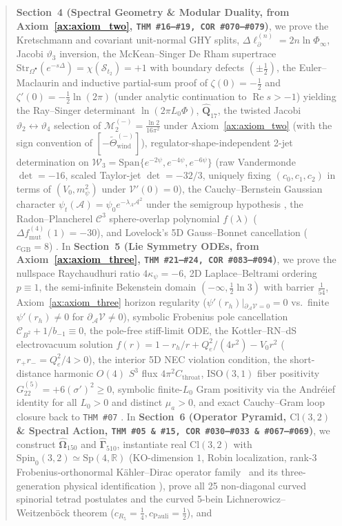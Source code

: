 \documentclass[11pt,a4paper]{article}
\newcommand{\catD}{\text{\textbf{\textcolor{blue!75!black}{[D]}}}}
\newcommand{\catH}{\text{\textbf{\textcolor{orange!80!black}{[H]}}}}
\theoremstyle{definition}
\theoremstyle{plain}
\theoremstyle{remark}
\begin{document}
\begin{abstract}
\textbf{Section~4 (Spectral Geometry \& Modular Duality, from Axiom~\ref{ax:axiom_two}, \texttt{THM~\#16--\#19, COR~\#070--\#079})}, we prove the Kretschmann and covariant unit-normal GHY splits, $\Delta\ell_\partial^{(n)} = 2n\ln\Phi_\infty$, Jacobi $\vartheta_3$ inversion, the McKean--Singer De Rham supertrace $\mathrm{Str}_{\Omega^\bullet}(e^{-s\Delta}) = \chi(\mathcal{S}_{t_2}) = +1$ with boundary defects $(\pm\frac{1}{2})$, the Euler--Maclaurin and inductive partial-sum proof of $\zeta(0) = -\frac{1}{2}$ and $\zeta'(0) = -\frac{1}{2}\ln(2\pi)$ (under analytic continuation to $\operatorname{Re} s > -1$) yielding the Ray--Singer determinant $\ln(2\pi L_0\Phi)$, $\widehat{\mathbf{Q}}_{17}$, the twisted Jacobi $\vartheta_2 \leftrightarrow \vartheta_4$ selection of $\mathcal{M}_2^{(-)} = \frac{\ln 2}{16\pi^2}$ under Axiom~\ref{ax:axiom_two} (with the sign convention of $[-\widetilde{\Theta}_{\mathrm{wind}}^{(-)}]$), regulator-shape-independent 2-jet determination on $\mathcal{W}_3 = \mathrm{Span}\{e^{-2\psi}, e^{-4\psi}, e^{-6\psi}\}$ (raw Vandermonde $\det = -16$, scaled Taylor-jet $\det = -32/3$, uniquely fixing $(c_0,c_1,c_2)$ in terms of $(V_0, m_\psi^2)$ under $\mathcal{V}'(0)=0$), the Cauchy--Bernstein Gaussian character $\psi_t(\mathcal{A}) = \psi_0 e^{-\lambda_A\mathcal{A}^2}$ under the semigroup hypothesis \catH, the Radon--Plancherel $\mathcal{C}^3$ sphere-overlap polynomial $f(\lambda)$ ($\Delta f_{\mathrm{mut}}^{(4)}(1) = -30$), and Lovelock's 5D Gauss--Bonnet cancellation ($c_{\mathrm{GB}} = 8$) \catD. In \textbf{Section~5 (Lie Symmetry ODEs, from Axiom~\ref{ax:axiom_three}, \texttt{THM~\#21--\#24, COR~\#083--\#094})}, we prove the nullspace Raychaudhuri ratio $4\kappa_\psi = -6$, 2D Laplace--Beltrami ordering $p \equiv 1$, the semi-infinite Bekenstein domain $(-\infty, \frac{1}{2}\ln 3)$ with barrier $\frac{1}{54}$, Axiom~\ref{ax:axiom_three} horizon regularity ($\psi'(r_h)\big\vert{}_{\partial_{\mathcal{A}}\mathcal{V}=0} = 0$ vs.\ finite $\psi'(r_h) \neq 0$ for $\partial_{\mathcal{A}}\mathcal{V} \neq 0$), symbolic Frobenius pole cancellation $\mathcal{C}_{B^2} + 1/b_{-1} \equiv 0$, the pole-free stiff-limit ODE, the Kottler--RN--dS electrovacuum solution $f(r) = 1 - r_h/r + Q_e^2/(4r^2) - V_0 r^2$ ($r_+ r_- = Q_e^2/4 > 0$), the interior 5D NEC violation condition, the short-distance harmonic $O(4)$ $S^3$ flux $4\pi^2 C_{\mathrm{throat}}$, $\mathrm{ISO}(3,1)$ fiber positivity $G_{22}^{(5)} = +6(\sigma')^2 \ge 0$, symbolic finite-$L_0$ Gram positivity via the Andr\'eief identity for all $L_0 > 0$ and distinct $\mu_a > 0$, and exact Cauchy--Gram loop closure back to \texttt{THM~\#07} \catD. In \textbf{Section~6 (Operator Pyramid, $\mathrm{Cl}(3,2)$ \& Spectral Action, \texttt{THM~\#05 \& \#15, COR~\#030--\#033 \& \#067--\#069})}, we construct $\widehat{\bm{\Omega}}_{150}$ and $\widehat{\bm{\Gamma}}_{510}$, instantiate real $\mathrm{Cl}(3,2)$ with $\mathrm{Spin}_0(3,2) \simeq \mathrm{Sp}(4, \mathbb{R})$ (KO-dimension $1$, Robin localization, rank-3 Frobenius-orthonormal K\"ahler--Dirac operator family \catD\ and its three-generation physical identification \catH), prove all 25 non-diagonal curved spinorial tetrad postulates and the curved 5-bein Lichnerowicz--Weitzenb\"ock theorem ($c_{R_5} = \frac{1}{4}, c_{\mathrm{Pauli}} = \frac{1}{2}$), and 
\end{abstract}
\end{document}
